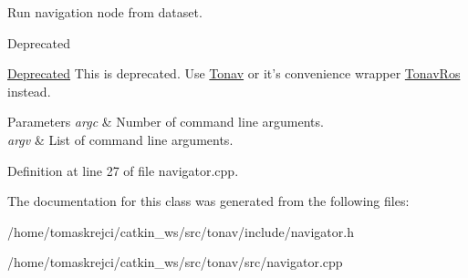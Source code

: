Run navigation node from dataset. 

\begin{DoxyRefDesc}{Deprecated}
\item[\hyperlink{deprecated__deprecated000003}{Deprecated}]This is deprecated. Use \hyperlink{class_tonav}{Tonav} or it's convenience wrapper \hyperlink{class_tonav_ros}{Tonav\-Ros} instead.\end{DoxyRefDesc}



\begin{DoxyParams}{Parameters}
{\em argc} & Number of command line arguments. \\
\hline
{\em argv} & List of command line arguments. \\
\hline
\end{DoxyParams}


Definition at line 27 of file navigator.\-cpp.



The documentation for this class was generated from the following files\-:\begin{DoxyCompactItemize}
\item 
/home/tomaskrejci/catkin\-\_\-ws/src/tonav/include/navigator.\-h\item 
/home/tomaskrejci/catkin\-\_\-ws/src/tonav/src/navigator.\-cpp\end{DoxyCompactItemize}
